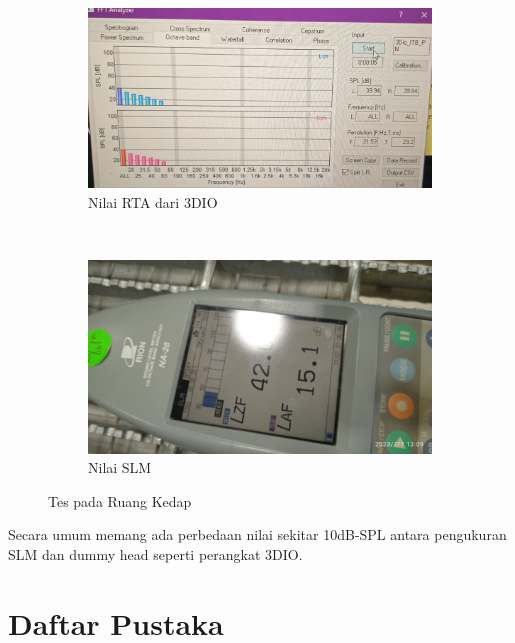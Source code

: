 \documentclass{article}
\begin{document}
	\begin{figure}[H]
		\centering
		\begin{subfigure}[]{.45\textwidth}
			\includegraphics[width=\textwidth]{images/tes_kedap_rta}
			\caption{Nilai RTA dari 3DIO}
		\end{subfigure}
		\\
		\begin{subfigure}[]{.45\textwidth}
			\includegraphics[width=\textwidth]{images/tes_kedap_slm}
			\caption{Nilai SLM}
		\end{subfigure}
		\caption{Tes pada Ruang Kedap}
	\end{figure}

	Secara umum memang ada perbedaan nilai sekitar 10dB-SPL antara pengukuran SLM dan dummy head seperti perangkat 3DIO\cite{Sudarsono2018}.

	\newpage
	\section{Daftar Pustaka}

	
	
\end{document}
